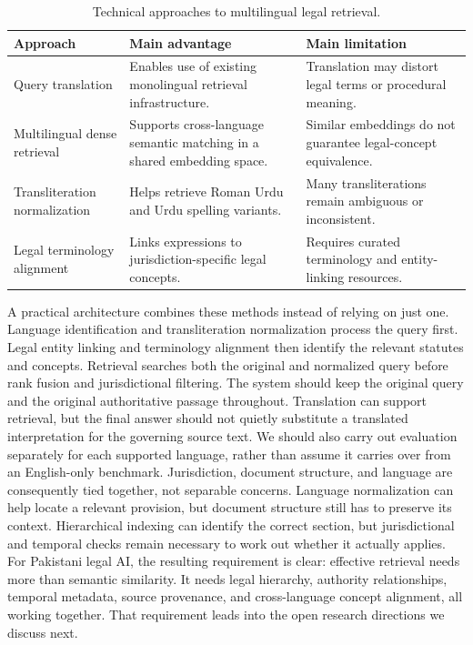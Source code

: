 \begin{table}[t]
\centering
\caption{Technical approaches to multilingual legal retrieval.}
\label{tab:multilingual}
\footnotesize
\setlength{\tabcolsep}{5pt}
\renewcommand{\arraystretch}{1.25}
\begin{tabularx}{\textwidth}{>{\raggedright\arraybackslash}p{3.0cm} >{\raggedright\arraybackslash}X >{\raggedright\arraybackslash}X}
\toprule
\textbf{Approach} & \textbf{Main advantage} & \textbf{Main limitation} \\
\midrule
Query translation & Enables use of existing monolingual retrieval infrastructure. & Translation may distort legal terms or procedural meaning. \\
Multilingual dense retrieval & Supports cross-language semantic matching in a shared embedding space. & Similar embeddings do not guarantee legal-concept equivalence. \\
Transliteration normalization & Helps retrieve Roman Urdu and Urdu spelling variants. & Many transliterations remain ambiguous or inconsistent. \\
Legal terminology alignment & Links expressions to jurisdiction-specific legal concepts. & Requires curated terminology and entity-linking resources. \\
\bottomrule
\end{tabularx}
\end{table}

A practical architecture combines these methods instead of relying on just one. Language
identification and transliteration normalization process the query first. Legal entity linking and
terminology alignment then identify the relevant statutes and concepts. Retrieval searches both the
original and normalized query before rank fusion and jurisdictional filtering. The system should
keep the original query and the original authoritative passage throughout. Translation can support
retrieval, but the final answer should not quietly substitute a translated interpretation for the
governing source text. We should also carry out evaluation separately for each supported language,
rather than assume it carries over from an English-only benchmark. Jurisdiction, document structure,
and language are consequently tied together, not separable concerns. Language normalization can help
locate a relevant provision, but document structure still has to preserve its context. Hierarchical
indexing can identify the correct section, but jurisdictional and temporal checks remain necessary
to work out whether it actually applies. For Pakistani legal AI, the resulting requirement is clear:
effective retrieval needs more than semantic similarity. It needs legal hierarchy, authority
relationships, temporal metadata, source provenance, and cross-language concept alignment, all
working together. That requirement leads into the open research directions we discuss next.
